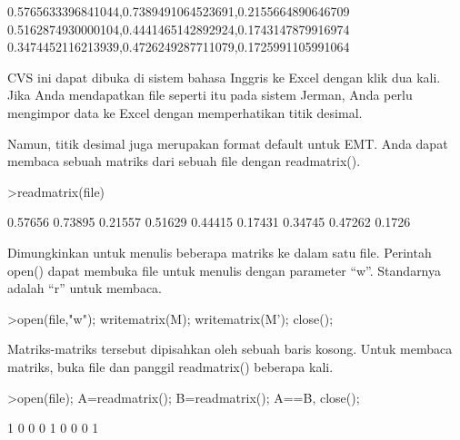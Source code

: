 \documentclass[a4paper,10pt]{article}
\begin{document}
\begin{eulernotebook}
\begin{eulercomment}
\begin{eulercomment}
\begin{eulercomment}
\begin{eulercomment}
\begin{eulercomment}
\begin{eulercomment}
\begin{eulercomment}
\begin{eulercomment}
\begin{eulercomment}
\begin{eulercomment}
\begin{eulercomment}
\begin{eulercomment}
\begin{eulercomment}
\begin{eulercomment}
\begin{eulercomment}
\begin{eulercomment}
\begin{eulercomment}
\begin{eulercomment}
\begin{eulercomment}
\begin{eulercomment}
\begin{eulercomment}
\begin{eulercomment}
\begin{eulercomment}
\begin{eulercomment}
\begin{euleroutput}
  0.5765633396841044,0.7389491064523691,0.2155664890646709
  0.5162874930000104,0.4441465142892924,0.1743147879916974
  0.3474452116213939,0.4726249287711079,0.1725991105991064
  
\end{euleroutput}
\begin{eulercomment}
CVS ini dapat dibuka di sistem bahasa Inggris ke Excel dengan klik dua
kali. Jika Anda mendapatkan file seperti itu pada sistem Jerman, Anda
perlu mengimpor data ke Excel dengan memperhatikan titik desimal.

Namun, titik desimal juga merupakan format default untuk EMT. Anda
dapat membaca sebuah matriks dari sebuah file dengan readmatrix().
\end{eulercomment}
\begin{eulerprompt}
>readmatrix(file)
\end{eulerprompt}
\begin{euleroutput}
    0.57656   0.73895   0.21557 
    0.51629   0.44415   0.17431 
    0.34745   0.47262    0.1726 
\end{euleroutput}
\begin{eulercomment}
Dimungkinkan untuk menulis beberapa matriks ke dalam satu file.
Perintah open() dapat membuka file untuk menulis dengan parameter “w”.
Standarnya adalah “r” untuk membaca.
\end{eulercomment}
\begin{eulerprompt}
>open(file,"w"); writematrix(M); writematrix(M'); close();
\end{eulerprompt}
\begin{eulercomment}
Matriks-matriks tersebut dipisahkan oleh sebuah baris kosong. Untuk
membaca matriks, buka file dan panggil readmatrix() beberapa kali.
\end{eulercomment}
\begin{eulerprompt}
>open(file); A=readmatrix(); B=readmatrix(); A==B, close();
\end{eulerprompt}
\begin{euleroutput}
          1         0         0 
          0         1         0 
          0         0         1 
\end{euleroutput}
\begin{eulercomment}

\end{eulercomment}
\end{eulercomment}
\end{eulercomment}
\end{eulercomment}
\end{eulercomment}
\end{eulercomment}
\end{eulercomment}
\end{eulercomment}
\end{eulercomment}
\end{eulercomment}
\end{eulercomment}
\end{eulercomment}
\end{eulercomment}
\end{eulercomment}
\end{eulercomment}
\end{eulercomment}
\end{eulercomment}
\end{eulercomment}
\end{eulercomment}
\end{eulercomment}
\end{eulercomment}
\end{eulercomment}
\end{eulercomment}
\end{eulercomment}
\end{eulercomment}
\end{eulernotebook}
\end{document}
